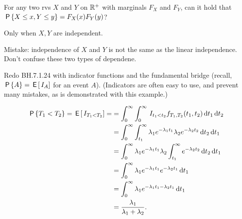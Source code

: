 \begin{exercise}
For any two rvs $X$ and $Y$ on $\R^{+}$ with marginals $F_{X}$ and $F_{Y}$, can  it hold that $\P{X\leq x, Y\leq y} = F_{X}(x) F_{Y}(y)$?
\begin{solution}
Only when $X, Y$ are independent.

Mistake:  independence of $X$ and $Y$ is not the same as the linear independence. Don't confuse these two types of dependene.
\end{solution}

\end{exercise}

\begin{exercise} Redo BH.7.1.24 with indicator functions and the  fundamental bridge (recall, $\P{A} = \E{\1{A}}$ for an event $A$).
(Indicators are often  easy to use, and prevent many mistakes, as is demonstrated with this example.)
\begin{solution}
\begin{align*}
\P{T_1 < T_2 } = \E{\1{T_1<T_2}} =
&= \int_0^\infty \int_0^\infty \1{t_1<t_2} f_{T_1, T_2}(t_1, t_2)\d t_{1} \d{t_2} \\
&= \int_0^\infty \int_{t_1}^{\infty}  \lambda_1 e^{-\lambda_1 t_1} \lambda_2 e^{-\lambda_2 t_2}  \d{t_2} \d{t_1}\\
&= \int_0^\infty   \lambda_1 e^{-\lambda_1 t_1} \lambda_2 \int_{t_1}^{\infty} e^{-\lambda_2 t_2}  \d{t_2} \d{t_1}\\
&= \int_0^\infty   \lambda_1 e^{-\lambda_1 t_1} e^{-\lambda_2 t_1}  \d{t_1}\\
&= \int_0^\infty   \lambda_1 e^{-\lambda_1 t_1 - \lambda_2t_{1}} \d{t_1}\\
&= \frac{\lambda_{1}}{\lambda_{1}+\lambda_2}.
\end{align*}
\end{solution}
\end{exercise}


